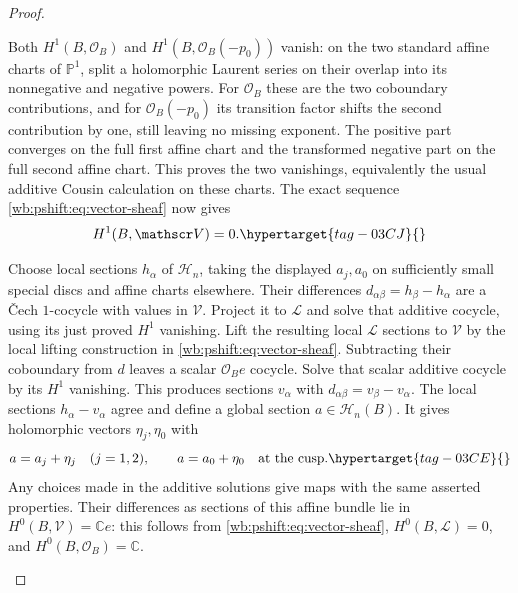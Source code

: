 \begin{proof}
\begin{enumerate}[label=\arabic*.,leftmargin=*]
Both $H^1(B,\mathcal O_B)$ and
$H^1(B,\mathcal O_B(-p_0))$ vanish: on the two standard affine
charts of $\mathbb P^1$, split a holomorphic Laurent series on
their overlap into its nonnegative and negative powers. For
$\mathcal O_B$ these are the two coboundary contributions, and
for $\mathcal O_B(-p_0)$ its transition factor shifts the second
contribution by one, still leaving no missing exponent. The positive
part converges on the full first affine chart and the transformed
negative part on the full second affine chart. This proves the two
vanishings, equivalently the usual additive Cousin calculation on
these charts. The exact sequence \eqref{wb:pshift:eq:vector-sheaf} now gives
\begin{equation}
                             H^1(B,\mathscr V)=0.
 \hypertarget{tag-03CJ}{}\label{wb:pshift:eq:no-analytic-obstruction}
\end{equation}

Choose
local sections $h_\alpha$ of $\mathscr H_n$, taking the displayed
$a_j,a_0$ on sufficiently small special discs and affine charts
elsewhere. Their differences $d_{\alpha\beta}=h_\beta-h_\alpha$
are a \v Cech $1$-cocycle with values in $\mathscr V$. Project it to
$\mathcal L$ and solve that additive cocycle, using its just proved
$H^1$ vanishing. Lift the resulting local $\mathcal L$ sections to
$\mathscr V$ by the local lifting construction in \eqref{wb:pshift:eq:vector-sheaf}. Subtracting
their coboundary from $d$ leaves a scalar $\mathcal O_Be$ cocycle.
Solve that scalar additive cocycle by its $H^1$ vanishing. This
produces sections $v_\alpha$ with
$d_{\alpha\beta}=v_\beta-v_\alpha$. The local sections
$h_\alpha-v_\alpha$ agree and define a global section
$a\in\mathscr H_n(B)$. It gives holomorphic vectors $\eta_j,\eta_0$ with
\begin{equation}
 a=a_j+\eta_j\quad(j=1,2),\qquad a=a_0+\eta_0
                              \quad\hbox{at the cusp}.
 \hypertarget{tag-03CE}{}\label{wb:pshift:eq:global-correction}
\end{equation}
Any choices made in the additive solutions give maps with the same
asserted properties. Their differences as sections of this affine
bundle lie in $H^0(B,\mathscr V)=\mathbb C e$: this follows from
\eqref{wb:pshift:eq:vector-sheaf}, $H^0(B,\mathcal L)=0$, and $H^0(B,\mathcal O_B)=\mathbb C$.


\end{enumerate}
\end{proof}
